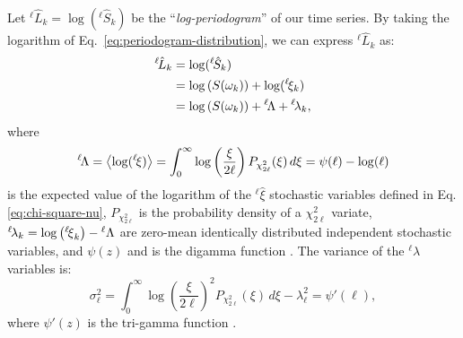 Let $^{{\ell\!}}\hat{L}_{k} = \log(^{\ell\!}\hat{S}_{k})$ be the ``\emph{log-periodogram}'' of our time series. By taking the logarithm of Eq.~\eqref{eq:periodogram-distribution}, we can express $^{\ell\!}\hat{L}_{k}$ as:
\begin{equation}
  \begin{aligned}
    ^{{\ell\!}}\hat{L}_{k} &= \log (^{\ell\!}\hat{S}_{k} ) \\
    &= \log\left(S(\omega_k) \right) + \log( ^{\ell\!}{\xi}_k) \\
    &= \log\left(S(\omega_k) \right) + {^{\ell\!}\rLambda} + {^{\ell\!}{\lambda}}_{k},
  \end{aligned} \label{eq:log-PSD}
\end{equation}
where
\begin{equation}
    {^{\ell\!}\rLambda} = \left\langle \log( {^{\ell\!}{\xi}}) \right\rangle = \int_0^\infty \log\left (\frac{\xi}{2\ell}\right ) P_{\chi^2_{2\ell}}(\xi) \, d\xi = \psi(\ell)-\log(\ell) \label{eq:lambda-ell}
\end{equation}
is the expected value of the logarithm of the ${^\ell}\hat\xi$ stochastic variables defined in Eq. \eqref{eq:chi-square-nu}, $P_{\chi^2_{2\ell}}$ is the probability density of a $\chi^2_{2\ell}$ variate, $^{\ell\!}{\lambda}_k = \log\left( {^{\ell\!}{\xi}}_k\right) - {^\ell{{\mathrm\Lambda}}}$ are zero-mean identically distributed independent stochastic variables, and $\psi(z)$ and is the digamma function \cite{PolyGamma}. 
The variance of the $^{\ell\!}\lambda$ variables is:
\begin{equation}
    \sigma_{\ell}^{2} = \int_0^\infty \log\left (\frac{\xi}{2\ell}\right )^2 P_{\chi^2_{2\ell}}(\xi) \, d\xi - \lambda_{\ell}^2 =\psi'(\ell),\label{eq:sigma2-ell}
\end{equation}
where $\psi'(z)$ is the tri-gamma function \cite{PolyGamma}. 

